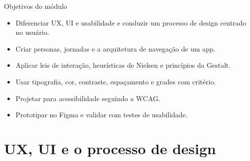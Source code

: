 \documentclass[aspectratio=169,10pt]{beamer}
\begin{document}
\capa

\begin{frame}{Objetivos do módulo}
  \begin{conceito}
    \begin{itemize}
      \item Diferenciar UX, UI e usabilidade e conduzir um processo de design centrado no usuário.
      \item Criar personas, jornadas e a arquitetura de navegação de um app.
      \item Aplicar leis de interação, heurísticas de Nielsen e princípios da Gestalt.
      \item Usar tipografia, cor, contraste, espaçamento e grades com critério.
      \item Projetar para acessibilidade seguindo a WCAG.
      \item Prototipar no Figma e validar com testes de usabilidade.
    \end{itemize}
  \end{conceito}
\end{frame}

\sumario

\section{UX, UI e o processo de design}
\end{document}
